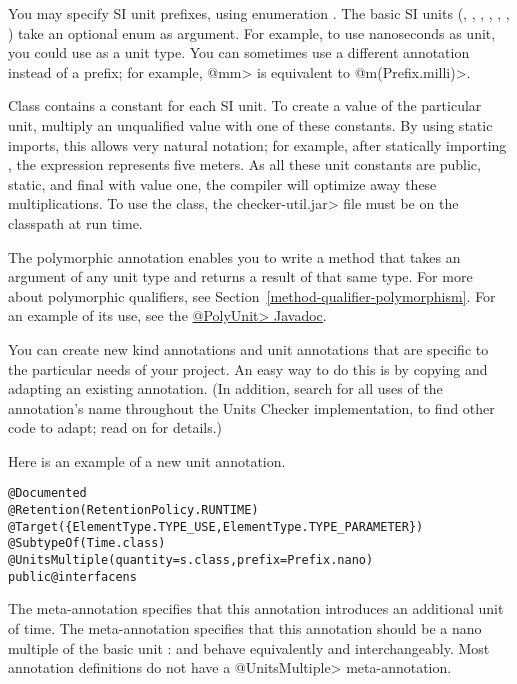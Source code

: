 You may specify SI unit prefixes, using enumeration .
The basic SI units
(, , , , ,
 , )
take an optional  enum as argument.
For example, to use nanoseconds as unit, you could use
 as a unit type.
You can sometimes use a different annotation instead of a prefix;
for example, \<@mm> is equivalent to \<@m(Prefix.milli)>.

Class  contains a constant for each SI unit.
To create a value of the particular unit, multiply an unqualified
value with one of these constants.
By using static imports, this allows very natural notation; for
example, after statically importing ,
the expression  represents five meters.
As all these unit constants are public, static, and final with value
one, the compiler will optimize away these multiplications.
To use the  class, the
\<checker-util.jar> file must be on the classpath at run time.

The polymorphic annotation 
enables you to write a method that takes an argument of any unit type and
returns a result of that same type.  For more about polymorphic qualifiers,
see Section~\ref{method-qualifier-polymorphism}.  For an example of its use, see
the
\href{../api/org/checkerframework/checker/units/qual/PolyUnit.html}{\<@PolyUnit>
Javadoc}.



You can create new kind annotations and unit annotations that are specific
to the particular needs of your project.  An easy way to do this is by
copying and adapting an existing annotation.  (In addition, search for all
uses of the annotation's name throughout the Units Checker implementation,
to find other code to adapt; read on for details.)

Here is an example of a new unit annotation.

\begin{alltt}
@Documented
@Retention(RetentionPolicy.RUNTIME)
@Target(\{ElementType.TYPE_USE, ElementType.TYPE_PARAMETER\})
@SubtypeOf(\ttlcb{}Time.class\ttrcb{})
@UnitsMultiple(quantity=s.class, prefix=Prefix.nano)
public @interface ns \ttlcb{}\ttrcb{}
\end{alltt}

The  meta-annotation specifies that this annotation
introduces an additional unit of time.
The  meta-annotation specifies that this annotation
should be a nano multiple of the basic unit :   and
behave equivalently and interchangeably.
Most annotation definitions do not have a \<@UnitsMultiple> meta-annotation.

